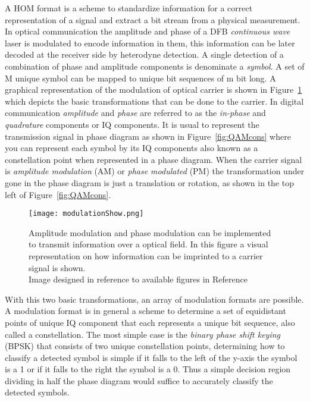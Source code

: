  
 A HOM format is a scheme to standardize information for a correct representation of a signal and extract a bit stream from a physical measurement. In optical communication the amplitude and phase of a DFB \textit{continuous wave} laser is modulated to encode information in them, this information can be later decoded at the receiver side by heterodyne detection. A single detection of a combination of phase and amplitude components is denominate a \textit{symbol}. A set of M unique symbol can be mapped to unique bit sequences of m bit long. A graphical representation of the modulation  of  optical carrier is shown in Figure~\ref{fig:AmPm} which depicts the basic transformations that can be done to the carrier. In digital communication  \textit{amplitude} and \textit{phase} are referred to as the \textit{in-phase} and \textit{quadrature} components or IQ components. It is usual to represent the transmission signal in phase diagram as shown in Figure~\ref{fig:QAMcons} where you can represent each symbol by its IQ components also known as a constellation point when represented in a phase diagram. When the carrier signal is  \textit{amplitude modulation} (AM) or \textit{phase modulated} (PM) the transformation under gone in the phase diagram is just a translation or rotation, as shown in the top left of Figure~\ref{fig:QAMcons}.
 
  \begin{figure}[h]
 \centering
 \texttt{[image: modulationShow.png]}
 \caption{Amplitude modulation and phase modulation can be implemented to transmit information over a optical field. In this figure a visual representation on how information can be imprinted to a carrier signal is shown.\\ {\scriptsize Image designed in reference to available figures in Reference~\cite{FundPhoto} } }
 \label{fig:AmPm}
 \end{figure}
 With this two basic transformations, an array of modulation formats are possible. A modulation format is in general a scheme to determine a set of equidistant points of unique IQ component that each represents a unique bit sequence, also called a constellation. The most simple case is the \textit{binary phase shift keying} (BPSK) that consists of two unique constellation points, determining how to classify a detected symbol is simple if it falls to the left of the y-axis the symbol is a 1 or if it falls to the right the symbol is a 0. Thus a simple decision region dividing in half the phase diagram would suffice to accurately classify the detected symbols.
 

